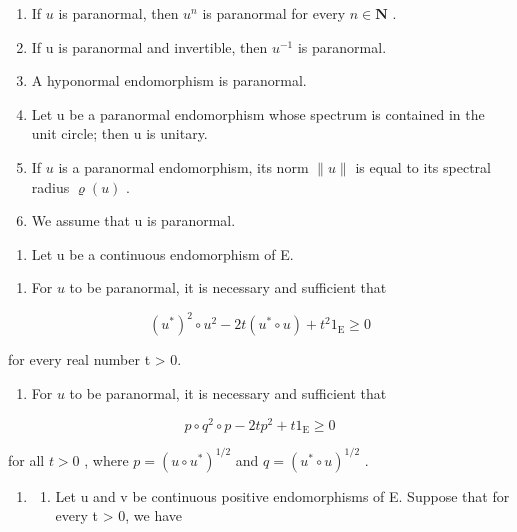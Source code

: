\begin{enumerate}
\def\labelenumi{\alph{enumi})}
\item
  If \(u\) is paranormal, then \(u^n\) is paranormal for every \(n \in \mathbf{N}\) .
\item
  If u is paranormal and invertible, then \(u^{-1}\) is paranormal.
\item
  A hyponormal endomorphism is paranormal.
\item
  Let u be a paranormal endomorphism whose spectrum is contained in the unit circle; then u is unitary.
\item
  If \(u\) is a paranormal endomorphism, its norm \(\| u\|\) is equal to its spectral radius \(\varrho(u)\) .
\item
  We assume that u is paranormal.
\end{enumerate}

\begin{enumerate}
\def\labelenumi{\arabic{enumi})}
\setcounter{enumi}{10}
\tightlist
\item
  Let u be a continuous endomorphism of E.
\end{enumerate}

\begin{enumerate}
\def\labelenumi{\alph{enumi})}
\tightlist
\item
  For \(u\) to be paranormal, it is necessary and sufficient that
\end{enumerate}

\[
(u ^ {*}) ^ {2} \circ u ^ {2} - 2 t (u ^ {*} \circ u) + t ^ {2} 1 _ {\mathrm{E}} \geqslant 0
\]

for every real number t \textgreater{} 0.

\begin{enumerate}
\def\labelenumi{\alph{enumi})}
\setcounter{enumi}{1}
\tightlist
\item
  For \(u\) to be paranormal, it is necessary and sufficient that
\end{enumerate}

\[
p \circ q ^ {2} \circ p - 2 t p ^ {2} + t 1 _ {\mathrm{E}} \geqslant 0
\]

for all \(t > 0\) , where \(p = (u \circ u^{*})^{1/2}\) and \(q = (u^{*} \circ u)^{1/2}\) .

\begin{enumerate}
\def\labelenumi{\arabic{enumi})}
\setcounter{enumi}{11}
\tightlist
\item
  \begin{enumerate}
  \def\labelenumii{\alph{enumii})}
  \tightlist
  \item
    Let u and v be continuous positive endomorphisms of E. Suppose that for every t \textgreater{} 0, we have
  \end{enumerate}
\end{enumerate}

